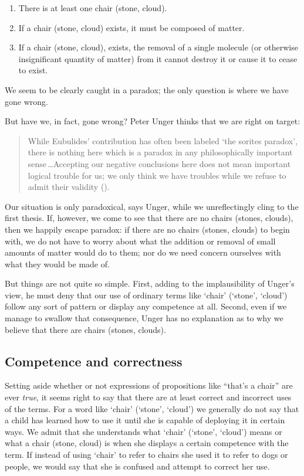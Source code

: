\documentclass[11pt]{article}
\newenvironment{squote}{%
	\begin{quote}\begin{singlespace}%
	}{%
	\end{singlespace}\end{quote}}
\begin{document}
\begin{spacing}{1.5}
\begin{enumerate}
  \item There is at least one chair (stone, cloud).
  \item If a chair (stone, cloud) exists, it must be composed of
    matter.
  \item If a chair (stone, cloud), exists, the removal of a single
    molecule (or otherwise insignificant quantity of matter) from it
    cannot destroy it or cause it to cease to exist.
\end{enumerate}

We seem to be clearly caught in a paradox; the only question is where
we have gone wrong.

But have we, in fact, gone wrong?  Peter Unger thinks that we are
right on target:

\begin{squote}
While Eubulides' contribution has often been labeled `the sorites
paradox', there is nothing here which is a paradox in any
philosophically important sense\,\ldots Accepting our negative
conclusions here does not mean important logical trouble for us; we
only think we have troubles while we refuse to admit their validity
(\citeyear[145]{unger1979}).
\end{squote}

Our situation is only paradoxical, says Unger, while we unreflectingly
cling to the first thesis.  If, however, we come to see that there are
no chairs (stones, clouds), then we happily escape paradox: if there
are no chairs (stones, clouds) to begin with, we do not have to worry
about what the addition or removal of small amounts of matter would do
to them; nor do we need concern ourselves with what they would be made
of.

But things are not quite so simple.  First, adding to the
implausibility of Unger's view, he must deny that our use of ordinary
terms like `chair' (`stone', `cloud') follow any sort of pattern or
display any competence at all.  Second, even if we manage to swallow
that consequence, Unger has no explanation as to why we believe that
there are chairs (stones, clouds).

\subsection{Competence and correctness}
\label{correct}
Setting aside whether or not expressions of propositions like ``that's
a chair'' are ever \emph{true}, it seems right to say that there are
at least correct and incorrect uses of the terms.  For a word like
`chair' (`stone', `cloud') we generally do not say that a child has
learned how to use it until she is capable of deploying it in certain
ways.  We admit that she understands what `chair' (`stone', `cloud')
means or what a chair (stone, cloud) is when she displays a certain
competence with the term.  If instead of using `chair' to refer to
chairs she used it to refer to dogs or people, we would say that she
is confused and attempt to correct her use.


\end{spacing}
\end{document}
